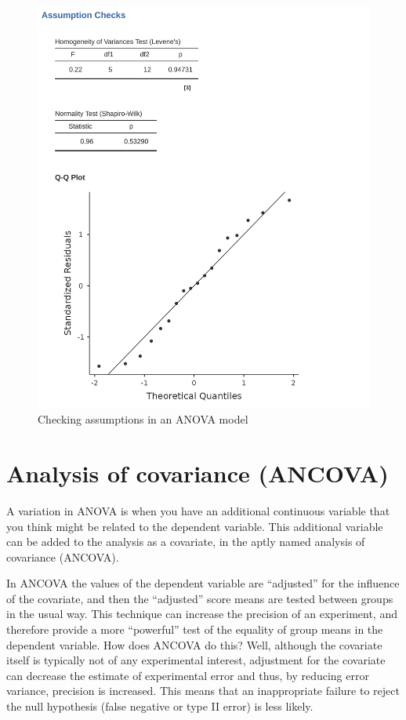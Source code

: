\documentclass[
  a4paper,
]{book}
\begin{document}
\begin{figure}

\includegraphics[width=1\textwidth,height=\textheight]{images/fig14-10.png} \hfill{}

\caption{\label{fig-fig14-10}Checking assumptions in an ANOVA model}

\end{figure}

\hypertarget{sec-analysis-of-covariance-ancova}{%
\section{Analysis of covariance
(ANCOVA)}\label{sec-analysis-of-covariance-ancova}}

A variation in ANOVA is when you have an additional continuous variable
that you think might be related to the dependent variable. This
additional variable can be added to the analysis as a covariate, in the
aptly named analysis of covariance (ANCOVA).

In ANCOVA the values of the dependent variable are ``adjusted'' for the
influence of the covariate, and then the ``adjusted'' score means are
tested between groups in the usual way. This technique can increase the
precision of an experiment, and therefore provide a more ``powerful''
test of the equality of group means in the dependent variable. How does
ANCOVA do this? Well, although the covariate itself is typically not of
any experimental interest, adjustment for the covariate can decrease the
estimate of experimental error and thus, by reducing error variance,
precision is increased. This means that an inappropriate failure to
reject the null hypothesis (false negative or type II error) is less
likely.
\end{document}
